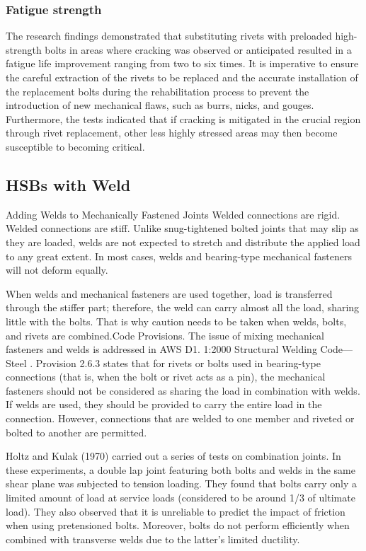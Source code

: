 \subsubsection{Fatigue strength}

The research findings \cite{steinhardt1969-hybrid, reemsnyder1975Fatigue} demonstrated that substituting rivets with preloaded high-strength bolts in areas where cracking was observed or anticipated resulted in a fatigue life improvement ranging from two to six times. It is imperative to ensure the careful extraction of the rivets to be replaced and the accurate installation of the replacement bolts during the rehabilitation process to prevent the introduction of new mechanical flaws, such as burrs, nicks, and gouges. Furthermore, the tests indicated that if cracking is mitigated in the crucial region through rivet replacement, other less highly stressed areas may then become susceptible to becoming critical.


\subsection{HSBs with Weld} \label{sec-hsbweld}

Adding Welds to Mechanically Fastened Joints Welded connections are rigid. Welded connections are stiff. Unlike snug-tightened bolted joints that may slip as they are loaded, welds are not expected to stretch and distribute the applied load to any great extent. In most cases, welds and bearing-type mechanical fasteners will not deform equally.

When welds and mechanical fasteners are used together, load is transferred through the stiffer part; therefore, the weld can carry almost all the load, sharing little with the bolts. That is why caution needs to be taken when welds, bolts, and rivets are combined.Code Provisions. The issue of mixing mechanical fasteners and welds is addressed in AWS D1. 1:2000 Structural Welding Code—Steel \cite{aws2000AWS}. Provision 2.6.3 states that for rivets or bolts used in bearing-type connections (that is, when the bolt or rivet acts as a pin), the mechanical fasteners should not be considered as sharing the load in combination with welds. If welds are used, they should be provided to carry the entire load in the connection. However, connections that are welded to one member and riveted or bolted to another are permitted.


Holtz and Kulak (1970) \cite{holtz1970high} carried out a series of tests on combination joints. In these experiments, a double lap joint featuring both bolts and welds in the same shear plane was subjected to tension loading. They found that bolts carry only a limited amount of load at service loads (considered to be around 1/3 of ultimate load). They also observed that it is unreliable to predict the impact of friction when using pretensioned bolts. Moreover, bolts do not perform efficiently when combined with transverse welds due to the latter's limited ductility.


